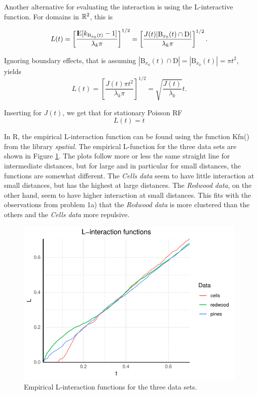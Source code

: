 Another alternative for evaluating the interaction is using the L-interactive function. For domains in $\mathbb{R}^2$, this is

\begin{equation}
    L(t) = \left[\frac{{\rm I\kern-.3em E}{[k_{\textrm{B}_{x_0}(t)}-1]}}{\lambda_k \pi}\right]^{1/2} = \left[\frac{J(t)|\textrm{B}_{x_0}(t) \cap \textrm{D}|}{\lambda_k \pi}\right]^{1/2}.
\end{equation}

Ignoring boundary effects, that is assuming $|\textrm{B}_{x_0}(t) \cap \textrm{D}| = |\textrm{B}_{x_0}(t)| = \pi t^2$, yields
\begin{equation}
    L(t) = \left[\frac{J(t)\pi t^2}{\lambda_k \pi}\right]^{1/2} = \sqrt{\frac{J(t)}{\lambda_k}}t .
    \label{eq:L_function}
\end{equation}

Inserting for $J(t)$, we get that for stationary Poisson RF
\begin{equation}
    L(t) = t
\end{equation}

In R, the empirical L-interaction function can be found using the function Kfn() from the library \textit{spatial}. The empirical L-function for the three data sets are shown in Figure \ref{fig:L_emp}. The plots follow more or less the same straight line for intermediate distances, but for large and in particular for small distances, the functions are somewhat different. The \textit{Cells data} seem to have little interaction at small distances, but has the highest at large distances. The \textit{Redwood data}, on the other hand, seem to have higher interaction at small distances. This fits with the observations from problem 1a) that the \textit{Redwood data} is more clustered than the others and the \textit{Cells data} more repulsive. 

\begin{figure}
    \centering
    \includegraphics[scale=0.95]{figures/prob1_L_empirical.pdf}
    \caption{Empirical L-interaction functions for the three data sets.}
    \label{fig:L_emp}
\end{figure}

